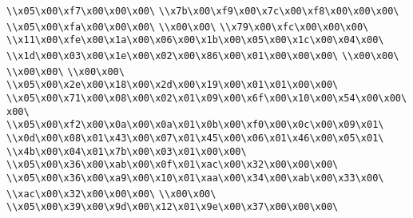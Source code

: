 \verb|\\x05\x00\xf7\x00\x00\x00\|\newline
\verb|\\x7b\x00\xf9\x00\x7c\x00\xf8\x00\x00\x00\|\newline
\verb|\\x05\x00\xfa\x00\x00\x00\|\newline
\verb|\\x00\x00\|\newline
\verb|\\x79\x00\xfc\x00\x00\x00\|\newline
\verb|\\x11\x00\xfe\x00\x1a\x00\x06\x00\x1b\x00\x05\x00\x1c\x00\x04\x00\|\newline
\verb|\\x1d\x00\x03\x00\x1e\x00\x02\x00\x86\x00\x01\x00\x00\x00\|\newline
\verb|\\x00\x00\|\newline
\verb|\\x00\x00\|\newline
\verb|\\x00\x00\|\newline
\verb|\\x05\x00\x2e\x00\x18\x00\x2d\x00\x19\x00\x01\x01\x00\x00\|\newline
\verb|\\x05\x00\x71\x00\x08\x00\x02\x01\x09\x00\x6f\x00\x10\x00\x54\x00\x00\x00\|\newline
\verb|\\x05\x00\xf2\x00\x0a\x00\x0a\x01\x0b\x00\xf0\x00\x0c\x00\x09\x01\|\newline
\verb|\\x0d\x00\x08\x01\x43\x00\x07\x01\x45\x00\x06\x01\x46\x00\x05\x01\|\newline
\verb|\\x4b\x00\x04\x01\x7b\x00\x03\x01\x00\x00\|\newline
\verb|\\x05\x00\x36\x00\xab\x00\x0f\x01\xac\x00\x32\x00\x00\x00\|\newline
\verb|\\x05\x00\x36\x00\xa9\x00\x10\x01\xaa\x00\x34\x00\xab\x00\x33\x00\|\newline
\verb|\\xac\x00\x32\x00\x00\x00\|\newline
\verb|\\x00\x00\|\newline
\verb|\\x05\x00\x39\x00\x9d\x00\x12\x01\x9e\x00\x37\x00\x00\x00\|\newline
